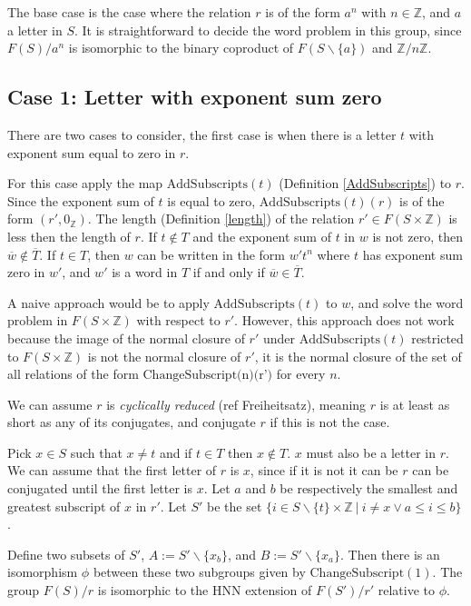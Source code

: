 \documentclass[11pt]{article} %
\theoremstyle{definition}
\theoremstyle{definition}
\theoremstyle{definition}
\theoremstyle{definition}
\theoremstyle{definition}
\theoremstyle{definition}
\begin{document}
The base case is the case where the relation $r$ is of the form $a^n$ with
$n \in \mathbb{Z}$, and $a$ a letter in $S$. It is straightforward to decide
the word problem in this group, since $F(S) / a^n$ is isomorphic
to the binary coproduct of $F(S \backslash \{a\})$ and $\mathbb{Z}/n\mathbb{Z}$.

\subsection{Case 1: Letter with exponent sum zero}\label{expsumzero}
There are two cases to consider, the first case is when there is a letter $t$
with exponent sum equal to zero in $r$.

For this case apply the map $\text{AddSubscripts}(t)$ (Definition \ref{AddSubscripts}) to $r$.
Since the exponent sum of $t$ is equal to zero, $\text{AddSubscripts}(t)(r)$ is
of the form $(r', 0_\mathbb{Z})$.
The length (Definition \ref{length}) of the relation $r' \in F(S \times \mathbb{Z})$
is less then the length of $r$.
If $t \notin T$ and the exponent sum of $t$ in $w$ is not zero,
then $\overline{w} \notin \overline{T}$.
If $t \in T$, then $w$ can be written in the
form $w' t^n$ where $t$ has exponent sum zero in $w'$, and $w'$ is a word in $T$ if
and only if $\overline{w} \in \overline{T}$.

A naive approach would be to apply $\text{AddSubscripts}(t)$ to $w$, and solve the word
problem in $F(S \times \mathbb{Z})$ with respect to $r'$. However, this approach does not work
because the image of the normal closure of $r'$ under $\text{AddSubscripts}(t)$ restricted
to $F(S \times \mathbb{Z})$ is not the normal closure of $r'$, it is the normal closure of
the set of all relations of the form $\text{ChangeSubscript(n)(r')}$ for every $n$.

We can assume $r$ is \textit{cyclically reduced} (ref Freiheitsatz), meaning $r$
is at least as short as any of its conjugates, and conjugate $r$ if this is not the case.

Pick $x \in S$ such that $x \ne t$ and if $t \in T$ then $x \notin T$. $x$ must also
be a letter in $r$. We can assume that the first letter of $r$ is
$x$, since if it is not it can be $r$ can be conjugated until the first letter is $x$.
Let $a$ and $b$ be respectively the
smallest and greatest subscript of $x$ in $r'$. Let $S'$ be the set
$\{i \in S \backslash \{t\} \times \mathbb{Z} \ | \ i \ne x \vee a \le i \le b \}$.

Define two subsets of $S'$, $A := S' \backslash \{x_b\}$, and $B := S' \backslash \{x_a\}$.
Then there is an isomorphism $\phi$ between these two subgroups given by
$\text{ChangeSubscript}(1)$.
The group $F(S) / r$ is isomorphic to the HNN extension of $F(S') / r'$ relative to $\phi$.
\end{document}
